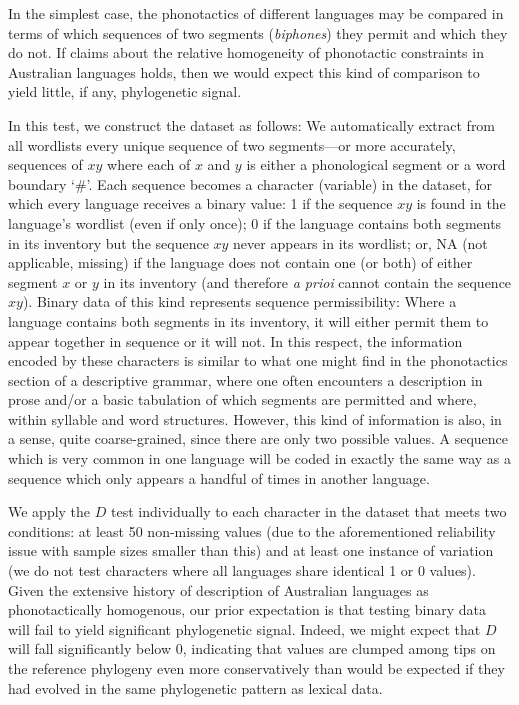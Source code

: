 In the simplest case, the phonotactics of different languages may be compared in terms of which sequences of two segments (\emph{biphones}) they permit and which they do not. If claims about the relative homogeneity of phonotactic constraints in Australian languages holds, then we would expect this kind of comparison to yield little, if any, phylogenetic signal.

In this test, we construct the dataset as follows: We automatically extract from all wordlists every unique sequence of two segments---or more accurately, sequences of \(xy\) where each of \(x\) and \(y\) is either a phonological segment or a word boundary `\#'. Each sequence becomes a character (variable) in the dataset, for which every language receives a binary value: 1 if the sequence \(xy\) is found in the language's wordlist (even if only once); 0 if the language contains both segments in its inventory but the sequence \(xy\) never appears in its wordlist; or, NA (not applicable, missing) if the language does not contain one (or both) of either segment \(x\) or \(y\) in its inventory (and therefore \emph{a prioi} cannot contain the sequence \(xy\)). Binary data of this kind represents sequence permissibility: Where a language contains both segments in its inventory, it will either permit them to appear together in sequence or it will not. In this respect, the information encoded by these characters is similar to what one might find in the phonotactics section of a descriptive grammar, where one often encounters a description in prose and/or a basic tabulation of which segments are permitted and where, within syllable and word structures. However, this kind of information is also, in a sense, quite coarse-grained, since there are only two possible values. A sequence which is very common in one language will be coded in exactly the same way as a sequence which only appears a handful of times in another language.

We apply the \(D\) test individually to each character in the dataset that meets two conditions: at least 50 non-missing values (due to the aforementioned reliability issue with sample sizes smaller than this) and at least one instance of variation (we do not test characters where all languages share identical 1 or 0 values). Given the extensive history of description of Australian languages as phonotactically homogenous, our prior expectation is that testing binary data will fail to yield significant phylogenetic signal. Indeed, we might expect that \(D\) will fall significantly below 0, indicating that values are clumped among tips on the reference phylogeny even more conservatively than would be expected if they had evolved in the same phylogenetic pattern as lexical data.


